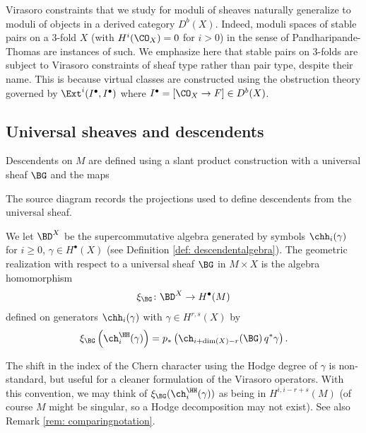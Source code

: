\begin{remark}
\notready\label{rem: stablepairsPT}
Virasoro constraints that we study for moduli of sheaves naturally generalize to moduli of objects in a derived category $D^b(X)$. Indeed, moduli spaces of stable pairs on a 3-fold $X$ (with $H^i(\CO_X)=0$ for $i>0$) in the sense of Pandharipande-Thomas \cite{PT} are instances of such. We emphasize here that stable pairs on 3-folds are subject to Virasoro constraints of sheaf type rather than pair type, despite their name. This is because virtual classes are constructed using the obstruction theory governed by $\Ext^i(I^\bullet,I^\bullet)$ where $I^\bullet=[\CO_X\to F]\in D^b(X)$.

\end{remark}


\subsection{Universal sheaves and descendents}
\label{sec: descendents}
Descendents on $M$ are defined using a slant product construction with a universal sheaf $\BG$ and the maps

The source diagram records the projections used to define descendents from
the universal sheaf.

\begin{definition}
\notready\label{def: geometricrealization}
We let $\BD^X$ be the supercommutative algebra generated by symbols $\chh_i(\gamma)$ for $i\geq 0$, $\gamma\in H^\bullet(X)$ (see Definition \ref{def: descendentalgebra}). The geometric realization with respect to a universal sheaf $\BG$ in $M\times X$ is the algebra homomorphism
\[\xi_\BG\colon \BD^X\to H^\bullet(M)\]
defined on generators $\chh_i(\gamma)$ with $\gamma\in H^{r,s}(X)$ by
\[\xi_\BG\left(\ch_i^\HH(\gamma)\right)=p_\ast\left(\ch_{i+\dim(X)-r}(\BG)\,q^\ast \gamma\right).\]
\end{definition}
The shift in the index of the Chern character using the Hodge degree of $\gamma$ is non-standard, but useful for a cleaner formulation of the Virasoro operators. With this convention, we may think of $\xi_\BG(\ch_i^\HH(\gamma))$ as being in $H^{i, i-r+s}(M)$ (of course $M$ might be singular, so a Hodge decomposition may not exist). See also Remark \ref{rem: comparingnotation}.

